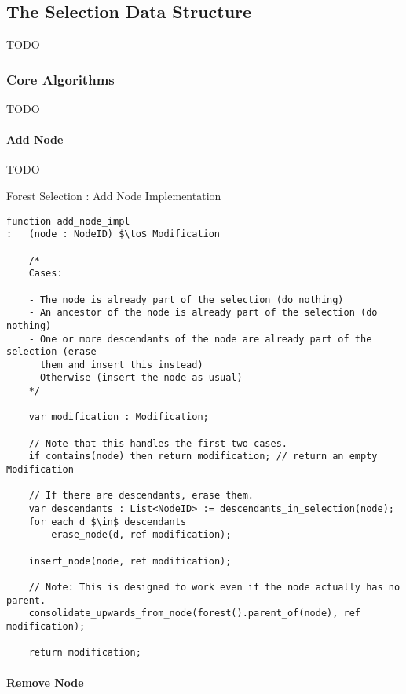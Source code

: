 \subsection{The Selection Data Structure}

TODO

\subsubsection{Core Algorithms}

TODO

\paragraph{Add Node}

TODO

\begin{stulisting}[p]
\caption{Forest Selection : Add Node Implementation}
\label{code:ipfs-selection-addnodeimpl}
\begin{lstlisting}[style=Default]
function add_node_impl
:	(node : NodeID) $\to$ Modification

	/*
	Cases:

	- The node is already part of the selection (do nothing)
	- An ancestor of the node is already part of the selection (do nothing)
	- One or more descendants of the node are already part of the selection (erase
	  them and insert this instead)
	- Otherwise (insert the node as usual)
	*/

	var modification : Modification;

	// Note that this handles the first two cases.
	if contains(node) then return modification;	// return an empty Modification

	// If there are descendants, erase them.
	var descendants : List<NodeID> := descendants_in_selection(node);
	for each d $\in$ descendants
		erase_node(d, ref modification);

	insert_node(node, ref modification);

	// Note: This is designed to work even if the node actually has no parent.
	consolidate_upwards_from_node(forest().parent_of(node), ref modification);

	return modification;
\end{lstlisting}
\end{stulisting}

\paragraph{Remove Node}


